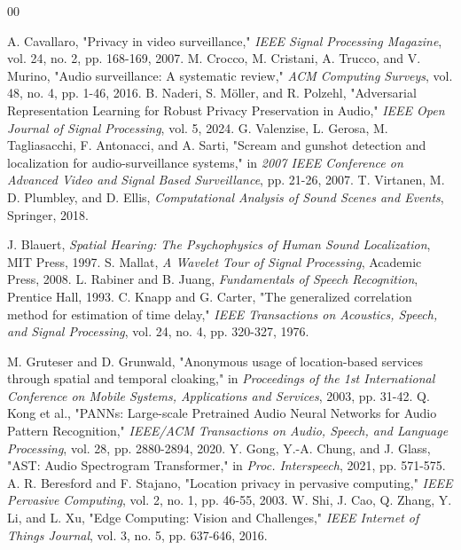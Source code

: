 \documentclass[conference]{IEEEtran}
\begin{document}
\begin{thebibliography}{00}

 A. Cavallaro, "Privacy in video surveillance," \textit{IEEE Signal Processing Magazine}, vol. 24, no. 2, pp. 168-169, 2007.
 M. Crocco, M. Cristani, A. Trucco, and V. Murino, "Audio surveillance: A systematic review," \textit{ACM Computing Surveys}, vol. 48, no. 4, pp. 1-46, 2016.
 B. Naderi, S. Möller, and R. Polzehl, "Adversarial Representation Learning for Robust Privacy Preservation in Audio," \textit{IEEE Open Journal of Signal Processing}, vol. 5, 2024.
 G. Valenzise, L. Gerosa, M. Tagliasacchi, F. Antonacci, and A. Sarti, "Scream and gunshot detection and localization for audio-surveillance systems," in \textit{2007 IEEE Conference on Advanced Video and Signal Based Surveillance}, pp. 21-26, 2007.
 T. Virtanen, M. D. Plumbley, and D. Ellis, \textit{Computational Analysis of Sound Scenes and Events}, Springer, 2018.

 J. Blauert, \textit{Spatial Hearing: The Psychophysics of Human Sound Localization}, MIT Press, 1997.
 S. Mallat, \textit{A Wavelet Tour of Signal Processing}, Academic Press, 2008.
 L. Rabiner and B. Juang, \textit{Fundamentals of Speech Recognition}, Prentice Hall, 1993.
 C. Knapp and G. Carter, "The generalized correlation method for estimation of time delay," \textit{IEEE Transactions on Acoustics, Speech, and Signal Processing}, vol. 24, no. 4, pp. 320-327, 1976.

 M. Gruteser and D. Grunwald, "Anonymous usage of location-based services through spatial and temporal cloaking," in \textit{Proceedings of the 1st International Conference on Mobile Systems, Applications and Services}, 2003, pp. 31-42.
 Q. Kong et al., "PANNs: Large-scale Pretrained Audio Neural Networks for Audio Pattern Recognition," \textit{IEEE/ACM Transactions on Audio, Speech, and Language Processing}, vol. 28, pp. 2880-2894, 2020.
 Y. Gong, Y.-A. Chung, and J. Glass, "AST: Audio Spectrogram Transformer," in \textit{Proc. Interspeech}, 2021, pp. 571-575.
 A. R. Beresford and F. Stajano, "Location privacy in pervasive computing," \textit{IEEE Pervasive Computing}, vol. 2, no. 1, pp. 46-55, 2003.
 W. Shi, J. Cao, Q. Zhang, Y. Li, and L. Xu, "Edge Computing: Vision and Challenges," \textit{IEEE Internet of Things Journal}, vol. 3, no. 5, pp. 637-646, 2016.


\end{thebibliography}
\end{document}
